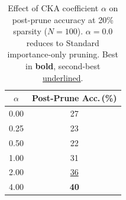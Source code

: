 \begin{table}[t]
\centering
\caption{Effect of CKA coefficient $\alpha$ on post-prune accuracy at 20\% sparsity ($N{=}100$). $\alpha{=}0.0$ reduces to Standard importance-only pruning. Best in \textbf{bold}, second-best \underline{underlined}.}
\label{tab:alpha}
\begin{tabular}{@{}cc@{}}
\toprule
$\alpha$ & Post-Prune Acc.\,(\%) \\
\midrule
0.00 & 27 \\
0.25 & 23 \\
0.50 & 22 \\
1.00 & 31 \\
2.00 & \underline{36} \\
4.00 & \textbf{40} \\
\bottomrule
\end{tabular}
\end{table}

